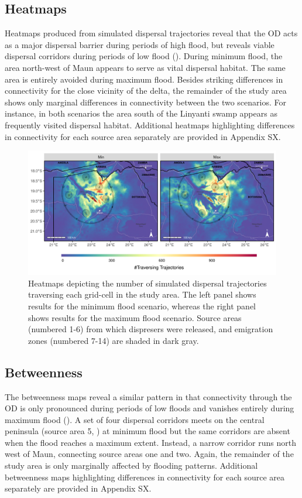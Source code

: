 \documentclass[abstract=on,10pt,a4paper,bibliography=totocnumbered]{article}
\begin{document}
\subsection{Heatmaps}
Heatmaps produced from simulated dispersal trajectories reveal that the OD acts
as a major dispersal barrier during periods of high flood, but reveals viable
dispersal corridors during periods of low flood (). During
minimum flood, the area north-west of Maun appears to serve as vital dispersal
habitat. The same area is entirely avoided during maximum flood. Besides
striking differences in connectivity for the close vicinity of the delta, the
remainder of the study area shows only marginal differences in connectivity
between the two scenarios. For instance, in both scenarios the area south of the
Linyanti swamp appears as frequently visited dispersal habitat. Additional
heatmaps highlighting differences in connectivity for each source area
separately are provided in Appendix SX.

\begin{figure}
  \begin{center}
  \includegraphics[width = \textwidth]{99_Heatmaps.png}
  \caption{Heatmaps depicting the number of simulated dispersal trajectories
  traversing each grid-cell in the study area. The left panel shows results for
  the minimum flood scenario, whereas the right panel shows results for the
  maximum flood scenario. Source areas (numbered 1-6) from which dispresers were
  released, and emigration zones (numbered 7-14) are shaded in dark gray.}
  \label{Heatmaps}
  \end{center}
\end{figure}

\subsection{Betweenness}
The betweenness maps reveal a similar pattern in that connectivity through the
OD is only pronounced during periods of low floods and vanishes entirely during
maximum flood (). A set of four dispersal corridors meets on
the central peninsula (source area 5, ) at minimum flood but
the same corridors are absent when the flood reaches a maximum extent. Instead,
a narrow corridor runs north west of Maun, connecting source areas one and two.
Again, the remainder of the study area is only marginally affected by flooding
patterns. Additional betweenness maps highlighting differences in connectivity
for each source area separately are provided in Appendix SX.
\end{document}
